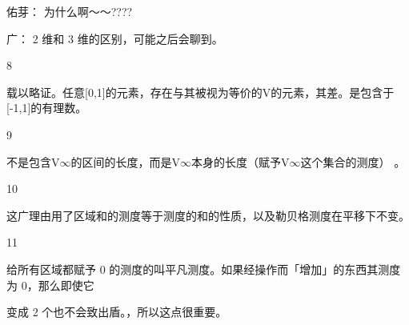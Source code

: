 佑芽： 为什么啊～～????\par
广： 2 维和 3 维的区别，可能之后会聊到。\par
8\par
载以略证。任意[0,1]的元素，存在与其被视为等价的V的元素，其差。是包含于[-1,1]的有理数。\par
9\par
不是包含V$\infty$的区间的长度，而是V$\infty$本身的长度（赋予V$\infty$这个集合的测度） 。\par
10\par
这广理由用了区域和的测度等于测度的和的性质，以及勒贝格测度在平移下不变。\par
11\par
给所有区域都赋予 0 的测度的叫平凡测度。如果经操作而「增加」的东西其测度为 0，那么即使它\par
变成 2 个也不会致出盾。，所以这点很重要。\par

